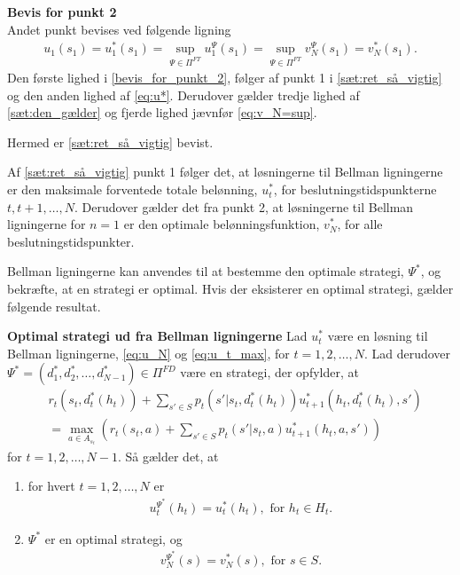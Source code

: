 \begin{bev}
\textbf{Bevis for punkt 2}\\
Andet punkt bevises ved følgende ligning
\begin{align} \label{bevis_for_punkt_2}
    u_1(s_1)=u_1^*(s_1)=\sup_{\Psi\in \Pi^{FT}}u_1^\Psi(s_1)=\sup_{\Psi\in \Pi^{FT}}v_N^\Psi(s_1)=v_N^*(s_1).
\end{align}
Den første lighed i \eqref{bevis_for_punkt_2}, følger af punkt 1 i \autoref{sæt:ret_så_vigtig} og den anden lighed af \eqref{eq:u*}. Derudover gælder tredje lighed af \autoref{sæt:den_gælder} og fjerde lighed jævnfør \eqref{eq:v_N=sup}.

Hermed er \autoref{sæt:ret_så_vigtig} bevist.
\end{bev}

Af \autoref{sæt:ret_så_vigtig} punkt 1 følger det, at løsningerne til Bellman ligningerne er den maksimale forventede totale belønning, $u_t^*$, for beslutningstidspunkterne $t, t+1, \ldots, N$.
Derudover gælder det fra punkt 2, at løsningerne til Bellman ligningerne for $n=1$ er den optimale belønningsfunktion, $v_N^*$, for alle beslutningstidspunkter. %

Bellman ligningerne kan anvendes til at bestemme den optimale strategi, $\Psi^*$, og bekræfte, at en strategi er optimal. Hvis der eksisterer en optimal strategi, gælder følgende resultat.
\begin{minipage}\textwidth
\begin{thmx}\label{sæt:optimal_strategi_ved_Bellman} \textbf{Optimal strategi ud fra Bellman ligningerne} %
\newline
Lad $u_t^*$ være en løsning til Bellman ligningerne, \eqref{eq:u_N} og \eqref{eq:u_t_max}, for $t=1,2, \ldots, N$. Lad derudover $\Psi^*=(d_1^*, d_2^*, \ldots, d_{N-1}^*)\in \Pi^{FD}$ være en strategi, der opfylder, at
\begin{align}\label{eq:optimal_strategi}
    &r_t\left(s_t, d_t^*(h_t)\right)+\sum_{s'\in S}p_t\left(s'|s_t, d_t^*(h_t)\right)u_{t+1}^*\left(h_t, d_t^*(h_t), s'\right)\nonumber\\
    &=\max_{a\in A_{s_t}}\left(r_t(s_t,a)+\sum_{s'\in S}p_t(s'|s_t, a)u_{t+1}^*(h_t, a, s')\right)
\end{align}
for $t=1, 2, \ldots, N-1$.
Så gælder det, at
\begin{enumerate}
    \item for hvert $t = 1, 2, \ldots, N$ er
    \begin{align*}
        u_t^{\Psi^*}(h_t) = u_t^*(h_t), \text{ for } h_t \in H_t.
    \end{align*}
    \item $\Psi^*$ er en optimal strategi, og 
    \begin{align*}
      v_N^{\Psi^*}(s)  = v_N^*(s), \text{ for } s \in S.
    \end{align*}
\end{enumerate}
\end{thmx}
\end{minipage}

